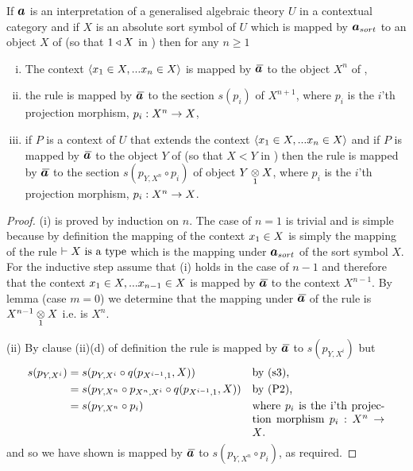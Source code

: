 \begin{lemma}
If $\iI$ is an interpretation of a generalised algebraic theory $U$ in a contextual category \catcw and if $X$ is an absolute sort symbol of $U$ which is mapped 
by $\iI_{sort}$ to an object $X$ of \catcw (so that $1 \base X$ in \catc) then for any $n \geq 1$ 
\begin{enumerate}[(i)]
\item
The context $\tuple{\ofT{x_1}{X},...\ofT{x_n}{X}}$ is mapped by $\Ibar$ to the object $X^n$ of \catc,
\item the rule 
 is mapped by $\Ibar$ to the section $s(p_i)$ of $X^{n+1}$, where $p_i$ is the $i$'th projection morphism, $p_i: X^n \morph X$,
\item if $P$ is a context of $U$ that extends the context $\tuple{\ofT{x_1}{X},...\ofT{x_n}{X}}$ and if $P$ is mapped by $\Ibar$ to
the object $Y$ of \catcw (so that $X < Y$ in \catc) then the rule 
 is mapped by $\Ibar$ to the section $s(p_{Y,X^n}\circ p_i)$ of object $\crossx{Y}{X}{1}$, where $p_i$ is the $i$'th projection morphism, $p_i: X^n \morph X$.
\end{enumerate}
\end{lemma}
\begin{proof}
(i) is proved by induction on $n$. The case of $n=1$ is trivial and is simple because by definition the mapping of the context $\ofT{x_1}{X}$ is simply the mapping of the rule $\tstyle \isT{X}$ which is the mapping under $\iI_{sort}$ of the sort symbol $X$. For the inductive step assume that (i) holds in the case of $n-1$ and therefore that the context $\ofT{x_1}{X},... \ofT{x_{n-1}}{X}$ is mapped by $\Ibar$ to the context $X^{n-1}$. 
By lemma  (case $m=0$) we determine that 
the mapping under $\Ibar$ of the rule  is $\crossx{X^{n-1}}{X}{1}$ i.e. is $X^n$.

(ii) By clause (ii)(d) of definition  
the rule  is mapped by $\Ibar$ to $s(p_{Y,X^i})$ but
\begin{align*}
s(p_{Y,X^i}) &= s(p_{Y,X^i} \circ q(p_{X^{i-1},1},X))                     &&\mbox{by (s3),}\\
             &= s(p_{Y,X^n} \circ p_{X^n,X^i} \circ q(p_{X^{i-1},1},X))   &&\mbox{by (P2),}\\
             &= s(p_{Y,X^n} \circ p_i)                                    &&\parbox[t]{4.2cm}{where $p_i$ is the i'th projection morphism $p_i:X^n \morph X$.}
\end{align*}
and so we have shown  is mapped by $\Ibar$ to $s(p_{Y,X^n}\circ p_i)$, as required.
\end{proof}

